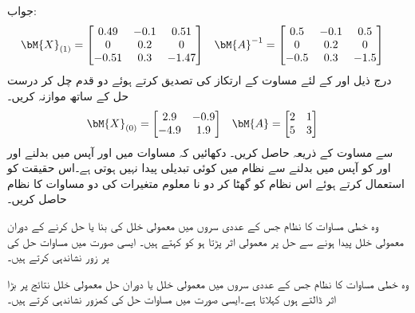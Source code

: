 جواب:
\begin{align*}
\bM{X}_{(1)}&=
\begin{bmatrix} 0.49&-0.1&0.51\\0&0.2&0\\-0.51&0.3&-1.47 \end{bmatrix} &
\bM{A}^{-1}&=\begin{bmatrix} 0.5&-0.1&0.5\\ 0&0.2&0\\ -0.5&0.3&-1.5 \end{bmatrix}
\end{align*}
\quad
درج ذیل  اور   کے لئے مساوت  کے ارتکاز کی تصدیق کرتے ہوئے  دو قدم چل کر درست حل کے ساتھ موازنہ کریں۔
\begin{align*}
\bM{X}_{(0)}&=\begin{bmatrix} 2.9& -0.9\\-4.9&1.9 \end{bmatrix} &
\bM{A}&=\begin{bmatrix} 2&1\\ 5&3 \end{bmatrix}
\end{align*}
\quad
{} سے مساوت  کے ذریعہ  حاصل کریں۔
\quad
دکھائیں کہ مساوات  میں  اور  آپس میں بدلنے اور  اور  کو آپس میں بدلنے سے نظام میں کوئی تبدیلی پیدا نہیں ہوتی ہے۔اس حقیقت کو استعمال کرتے ہوئے اس نظام کو گھٹا کر دو نا معلوم متغیرات کی دو مساوات کا نظام حاصل کریں۔

وہ خطی مساوات کا نظام جس کے عددی سروں میں معمولی خلل کی بنا یا حل کرنے کے دوران معمولی خلل پیدا ہونے سے حل پر معمولی اثر پڑتا ہو کو  کہتے ہیں۔ ایسی صورت میں مساوات حل کی پر زور نشاندہی کرتے ہیں۔

وہ خطی مساوات کا نظام جس کے عددی سروں میں معمولی خلل یا دوران حل معمولی خلل نتائج پر بڑا اثر ڈالتے ہوں  کہلاتا ہے۔ایسی صورت میں مساوات حل کی کمزور نشاندہی کرتے ہیں۔

